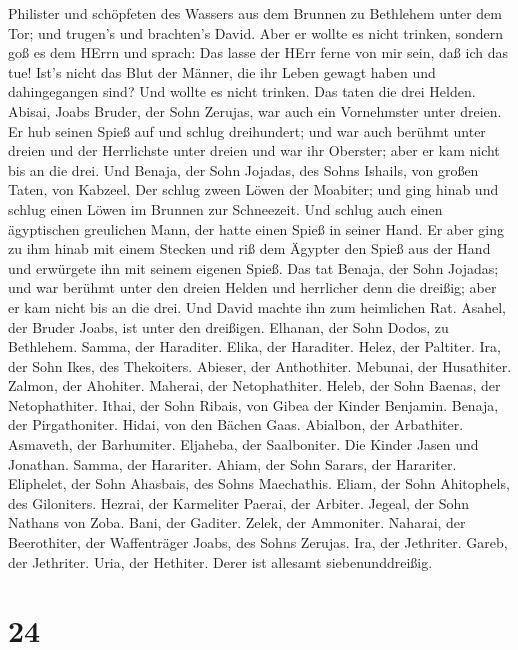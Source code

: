 Philister und schöpfeten des Wassers aus dem Brunnen zu Bethlehem unter
dem Tor; und trugen's und brachten's David. Aber er wollte es nicht
trinken, sondern goß es dem HErrn  und sprach: Das lasse
der HErr ferne von mir sein, daß ich das tue! Ist's nicht das Blut der
Männer, die ihr Leben gewagt haben und dahingegangen sind? Und wollte es
nicht trinken. Das taten die drei Helden.  Abisai, Joabs
Bruder, der Sohn Zerujas, war auch ein Vornehmster unter dreien. Er hub
seinen Spieß auf und schlug dreihundert; und war auch berühmt unter
dreien  und der Herrlichste unter dreien und war ihr
Oberster; aber er kam nicht bis an die drei.  Und Benaja,
der Sohn Jojadas, des Sohns Ishails, von großen Taten, von Kabzeel. Der
schlug zween Löwen der Moabiter; und ging hinab und schlug einen Löwen
im Brunnen zur Schneezeit.  Und schlug auch einen
ägyptischen greulichen Mann, der hatte einen Spieß in seiner Hand. Er
aber ging zu ihm hinab mit einem Stecken und riß dem Ägypter den Spieß
aus der Hand und erwürgete ihn mit seinem eigenen Spieß. 
Das tat Benaja, der Sohn Jojadas; und war berühmt unter den dreien
Helden  und herrlicher denn die dreißig; aber er kam nicht
bis an die drei. Und David machte ihn zum heimlichen Rat. 
Asahel, der Bruder Joabs, ist unter den dreißigen. Elhanan, der Sohn
Dodos, zu Bethlehem.  Samma, der Haraditer. Elika, der
Haraditer.  Helez, der Paltiter. Ira, der Sohn Ikes, des
Thekoiters.  Abieser, der Anthothiter. Mebunai, der
Husathiter.  Zalmon, der Ahohiter. Maherai, der
Netophathiter.  Heleb, der Sohn Baenas, der Netophathiter.
Ithai, der Sohn Ribais, von Gibea der Kinder Benjamin. 
Benaja, der Pirgathoniter. Hidai, von den Bächen Gaas. 
Abialbon, der Arbathiter. Asmaveth, der Barhumiter. 
Eljaheba, der Saalboniter. Die Kinder Jasen und Jonathan. 
Samma, der Harariter. Ahiam, der Sohn Sarars, der Harariter.
 Eliphelet, der Sohn Ahasbais, des Sohns Maechathis. Eliam,
der Sohn Ahitophels, des Giloniters.  Hezrai, der
Karmeliter Paerai, der Arbiter.  Jegeal, der Sohn Nathans
von Zoba. Bani, der Gaditer.  Zelek, der Ammoniter.
Naharai, der Beerothiter, der Waffenträger Joabs, des Sohns Zerujas.
 Ira, der Jethriter. Gareb, der Jethriter. 
Uria, der Hethiter. Derer ist allesamt siebenunddreißig.

\hypertarget{section-23}{%
\section{24}\label{section-23}}

